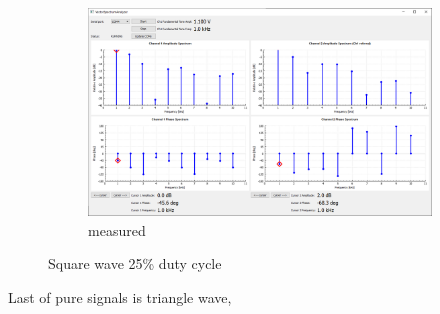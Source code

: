 \documentclass[notitlepage, a4paper, 11pt]{article}
\begin{document}
\begin{figure}[H]
\begin{subfigure}[][][t]{0.3\textwidth}
			\includegraphics[width=\textwidth, trim=10 80 555 100, clip]{../img/Circuit1/dut25}
			\caption{measured}
			\label{fig:meas-signal-a}
		\end{subfigure}
		\caption{Square wave 25\% duty cycle}
		\label{fig:pure-sin}
	\end{figure}
	
	Last of pure signals is triangle wave, 
	
\end{document}
